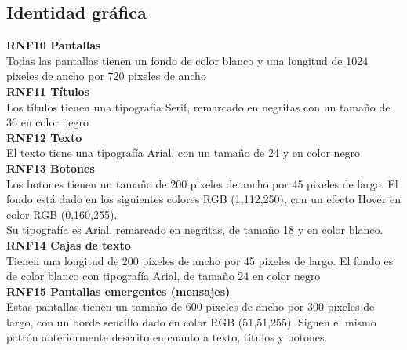 \subsection{Identidad gráfica}

\textbf{RNF10 \hspace{2cm}Pantallas}\\
Todas las pantallas tienen un fondo de color blanco y una longitud de 1024 pixeles de ancho por 720 pixeles de ancho\\

\textbf{RNF11 \hspace{2cm}Títulos}\\
Los títulos tienen una tipografía Serif, remarcado en negritas con un tamaño de 36 en color negro\\

\textbf{RNF12 \hspace{2cm}Texto}\\
El texto tiene una tipografía Arial, con un tamaño de 24 y en color negro\\

\textbf{RNF13 \hspace{2cm}Botones}\\
Los botones tienen un tamaño de 200 pixeles de ancho por 45 pixeles de largo.
El fondo está dado en los siguientes colores RGB (1,112,250), con un efecto Hover en color RGB (0,160,255).\\
Su tipografía es Arial, remarcado en negritas, de tamaño 18 y en color blanco.\\

\textbf{RNF14 \hspace{2cm}Cajas de texto}\\
Tienen una longitud de 200 pixeles de ancho por 45 pixeles de largo.
El fondo es de color blanco con tipografía Arial, de tamaño 24 en color negro\\

\textbf{RNF15 \hspace{2cm}Pantallas emergentes (mensajes)}\\
Estas pantallas tienen un tamaño de 600 pixeles de ancho por 300 pixeles de largo, con un borde sencillo dado en color RGB (51,51,255). Siguen el mismo patrón anteriormente descrito en cuanto a texto, títulos y botones.\\





